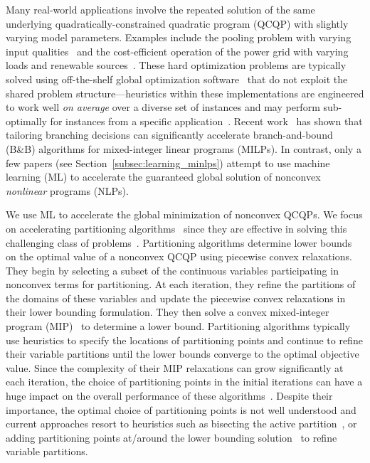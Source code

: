 \documentclass{article}
\newcommand{\pp}{partitioning points}
\begin{document}
Many real-world applications involve the repeated solution of the same underlying quadratically-constrained quadratic program (QCQP) with slightly varying model parameters.
Examples include the pooling problem with varying input qualities~\cite{misener2013glomiqo} and the cost-efficient operation of the power grid with varying loads and renewable sources~\cite{bienstock2022mathematical}.
These hard optimization problems are typically solved using off-the-shelf global optimization software~\cite{belotti2009branching,bestuzheva2021scip,lin2009global,misener2014antigone,nagarajan2019adaptive,sahinidis1996baron} that do not exploit the shared problem structure---heuristics within these implementations are engineered to work well \textit{on average} over a diverse set of instances and may perform sub-optimally for instances from a specific application~\cite{liu2019tuning}.
Recent work~\cite{bengio2021machine,lodi2017learning} has shown that tailoring branching decisions can significantly accelerate branch-and-bound (B\&B) algorithms for mixed-integer linear programs (MILPs).
In contrast, only a few papers (see Section~\ref{subsec:learning_minlps}) attempt to use machine learning (ML) to accelerate the guaranteed global solution of nonconvex \textit{nonlinear} programs (NLPs).


We use ML to accelerate the global minimization of nonconvex QCQPs.
We focus on accelerating partitioning algorithms~\cite{bergamini2008improved,saif2008global,wicaksono2008piecewise} since they are effective in solving this challenging class of problems~\cite{castro2016normalized,nagarajan2019adaptive}.
Partitioning algorithms determine lower bounds on the optimal value of a nonconvex QCQP using piecewise convex relaxations.
They begin by selecting a subset of the continuous variables participating in nonconvex terms for partitioning.
At each iteration, they refine the partitions of the domains of these variables and update the piecewise convex relaxations in their lower bounding formulation.
They then solve a convex mixed-integer program (MIP)~\cite{lu2018tight,sundar2021piecewise} to determine a lower bound.
Partitioning algorithms typically use heuristics to specify the locations of {\pp} and continue to refine their variable partitions until the lower bounds converge to the optimal objective value.
Since the complexity of their MIP relaxations can grow significantly at each iteration, the choice of {\pp} in the initial iterations can have a huge impact on the overall performance of these algorithms~\cite{nagarajan2019adaptive}.
Despite their importance, the optimal choice of partitioning points is not well understood and current approaches resort to heuristics such as bisecting the active partition~\cite{castro2016normalized,saif2008global,wicaksono2008piecewise}, or adding {\pp} at/around the lower bounding solution~\cite{bergamini2008improved,nagarajan2019adaptive} to refine variable partitions.
\end{document}

